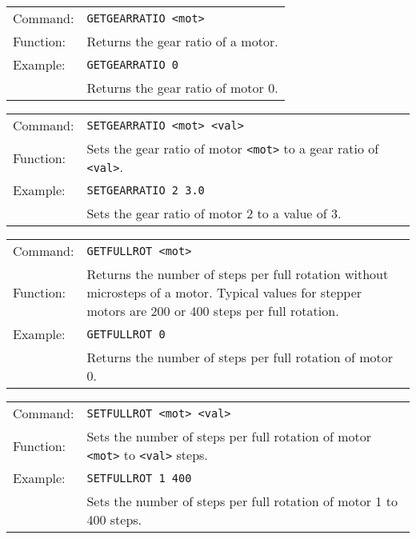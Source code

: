 \vspace{\vdistace}

\begin{table}[!htbp]
  \begin{tabularx}{\textwidth}{lX}
    Command:  & \texttt{GETGEARRATIO <mot>}\\
    Function: & Returns the gear ratio of a motor.\\
    Example:  & \texttt{GETGEARRATIO 0}\\
              & Returns the gear ratio of motor 0.
  \end{tabularx}
\end{table}

\vspace{\vdistace}

\begin{table}[!htbp]
  \begin{tabularx}{\textwidth}{lX}
    Command:  & \texttt{SETGEARRATIO <mot> <val>}\\
    Function: & Sets the gear ratio of motor \texttt{<mot>} to a gear ratio
                of \texttt{<val>}.\\
    Example:  & \texttt{SETGEARRATIO 2 3.0}\\
              & Sets the gear ratio of motor 2 to a value of 3.
  \end{tabularx}
\end{table}

\vspace{\vdistace}

\begin{table}[!htbp]
  \begin{tabularx}{\textwidth}{lX}
    Command:  & \texttt{GETFULLROT <mot>}\\
    Function: & Returns the number of steps per full rotation without microsteps of a motor. Typical values for stepper motors are 200 or 400 steps per full rotation.\\
    Example:  & \texttt{GETFULLROT 0}\\
              & Returns the number of steps per full rotation of motor 0.
  \end{tabularx}
\end{table}

\vspace{\vdistace}

\begin{table}[!htbp]
  \begin{tabularx}{\textwidth}{lX}
    Command:  & \texttt{SETFULLROT <mot> <val>}\\
    Function: & Sets the number of steps per full rotation of motor \texttt{<mot>} to \texttt{<val>} steps.\\
    Example:  & \texttt{SETFULLROT 1 400}\\
              & Sets the number of steps per full rotation of motor 1 to 400 steps.
  \end{tabularx}
\end{table}

